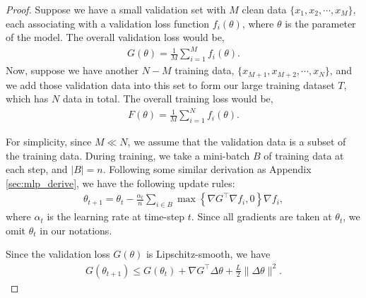 \begin{proof}
Suppose we have a small validation set with $M$ clean data $\{x_1, x_2, \cdots, x_M\}$, each
associating with a validation loss function $f_i(\theta)$, where $\theta$ is the parameter of the
model. The overall validation loss would be,
\begin{align}
  G(\theta) = \frac{1}{M} \sum_{i=1}^M f_i(\theta).
\end{align}
Now, suppose we have another $N-M$ training data, $\{x_{M+1}, x_{M+2}, \cdots, x_N\}$, and we add
those validation data into this set to form our large training dataset $T$, which has $N$ data in
total. The overall training loss would be,
\begin{align}
  F(\theta) = \frac{1}{M} \sum_{i=1}^N f_i(\theta).
\end{align}

For simplicity, since $M \ll N$, we assume that the validation data is a subset of the training
data. During training, we take a mini-batch $B$ of training data at each step, and $|B| = n$.
Following some similar derivation as Appendix \ref{sec:mlp_derive}, we have the following update
rules:
\begin{align}
\theta_{t+1} = \theta_t - \frac{\alpha_t}{n} \sum_{i \in B} \max \left\{\nabla G^\top \nabla f_i, 0
\right\} \nabla f_i,
\label{eq:updaterule}
\end{align}
where $\alpha_t$ is the learning rate at time-step $t$. Since all gradients are taken at $\theta_t$,
we omit $\theta_t$ in our notations.

Since the validation loss $G(\theta)$ is Lipschitz-smooth, we have
\begin{align}
G(\theta_{t+1}) \leq G(\theta_t) + \nabla G^\top\Delta \theta + \frac{L}{2} \lVert \Delta \theta \rVert^2.
\end{align}


\end{proof}
